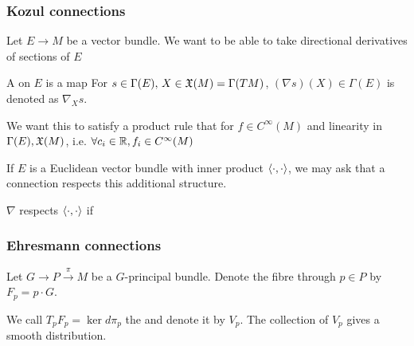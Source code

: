 \documentclass{article}
\begin{document}
\subsubsection{Kozul connections}
Let $ E \to M$ be a vector bundle. We want to be able to take directional derivatives of sections of $E$

\begin{definition}
A  on $E$ is a map 
For $s \in \Gamma(E), \, X \in \mathfrak{X}(M) = \Gamma(TM)$,
$(\nabla s)(X) \in \Gamma(E)$ is denoted as $\nabla_X s$. 
\end{definition}

We want this to satisfy a product rule that for $f \in C^\infty(M)$ 
and linearity in $\Gamma(E), \mathfrak{X}(M)$, i.e. $\forall c_i \in \mathbb{R}, f_i \in C^\infty(M)$

If $E$ is a Euclidean vector bundle with inner product $\left\langle \cdot, \cdot \right\rangle$, we may ask that a connection respects this additional structure. 

\begin{definition}
$\nabla$ respects  $\left\langle \cdot, \cdot \right\rangle$ if 
\end{definition}

\subsubsection{Ehresmann connections}

\begin{notation}
Let $G \to P \overset{\pi}{\to} M$ be a $G$-principal bundle. Denote the fibre through $p \in P$ by $F_p = p\cdot G$.
\end{notation}

\begin{definition}
	We call $T_p F_p = \ker d\pi_p$ the  and denote it by $V_p$. The collection of $V_p$ gives a smooth distribution. 
\end{definition}
\end{document}

